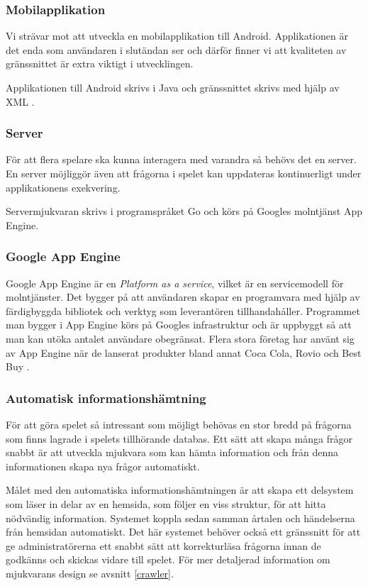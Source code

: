 \documentclass[a4paper, 11pt]{article}
\begin{document}
\subsubsection{Mobilapplikation}
Vi strävar mot att utveckla en mobilapplikation till Android. Applikationen är det enda som användaren i slutändan ser och därför finner vi att kvaliteten av gränssnittet är extra viktigt i utvecklingen. 

Applikationen till Android skrivs i Java och gränssnittet skrivs med hjälp av XML \cite{xml}. 

\subsubsection{Server}
För att flera spelare ska kunna interagera med varandra så behövs det en server. En server möjliggör även att frågorna i spelet kan uppdateras kontinuerligt under applikationens exekvering.

Servermjukvaran skrivs i programspråket Go \cite{golang} och körs på Googles molntjänst App Engine.

\subsubsection{Google App Engine} 
Google App Engine är en \textit{Platform as a service}, vilket är en servicemodell för molntjänster. Det bygger på att användaren skapar en programvara med hjälp av färdigbyggda bibliotek och verktyg som leverantören tillhandahåller. Programmet man bygger i App Engine körs på Googles infrastruktur och är uppbyggt så att man kan utöka antalet användare obegränsat. Flera stora företag har använt sig av App Engine när de lanserat produkter bland annat Coca Cola, Rovio och Best Buy \cite{googleappenginecustomers}. 

\subsubsection{Automatisk informationshämtning}
För att göra spelet så intressant som möjligt behövas en stor bredd på frågorna som finns lagrade i spelets tillhörande databas. Ett sätt att skapa många frågor snabbt är att utveckla mjukvara som kan hämta information och från denna informationen skapa nya frågor automatiskt. 

Målet med den automatiska informationshämtningen är att skapa ett delsystem som läser in delar av en hemsida, som följer en viss struktur, för att hitta nödvändig information. Systemet koppla sedan samman årtalen och händelserna från hemsidan automatiskt. Det här systemet behöver också ett gränssnitt för att ge administratörerna ett snabbt sätt att korrekturläsa frågorna innan de godkänns och skickas vidare till spelet. För mer detaljerad information om mjukvarans design se avsnitt \ref{crawler}.
\end{document}
